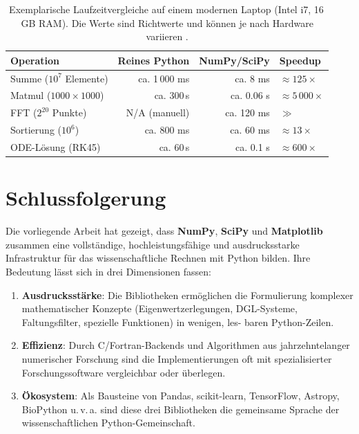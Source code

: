 \documentclass[12pt, a4paper]{article}
\begin{document}
\begin{table}[H]
  \centering
  \begin{tabular}{lrrl}
    \toprule
    \textbf{Operation} & \textbf{Reines Python} & \textbf{NumPy/SciPy} & \textbf{Speedup} \\
    \midrule
    Summe ($10^7$ Elemente) & ca. 1\,000 ms & ca. 8 ms & ${\approx}125\times$ \\
    Matmul ($1000\times1000$) & ca. 300\,s & ca. 0.06 s & ${\approx}5\,000\times$ \\
    FFT ($2^{20}$ Punkte) & N/A (manuell) & ca. 120 ms & $\gg$ \\
    Sortierung ($10^6$) & ca. 800 ms & ca. 60 ms & ${\approx}13\times$ \\
    ODE-Lösung (RK45) & ca. 60\,s & ca. 0.1 s & ${\approx}600\times$ \\
    \bottomrule
  \end{tabular}
  \caption{Exemplarische Laufzeitvergleiche auf einem modernen Laptop
           (Intel i7, 16\,GB RAM). Die Werte sind Richtwerte und können
           je nach Hardware variieren \cite{vanderplas2016python}.}
  \label{tab:perf}
\end{table}

\section{Schlussfolgerung}
\label{sec:conclusion}

Die vorliegende Arbeit hat gezeigt, dass \textbf{NumPy}, \textbf{SciPy}
und \textbf{Matplotlib} zusammen eine vollständige, hochleistungsfähige
und ausdrucksstarke Infrastruktur für das wissenschaftliche Rechnen mit
Python bilden. Ihre Bedeutung lässt sich in drei Dimensionen fassen:

\begin{enumerate}
  \item \textbf{Ausdrucksstärke}: Die Bibliotheken ermöglichen die
  Formulierung komplexer mathematischer Konzepte (Eigenwertzerlegungen,
  DGL-Systeme, Faltungsfilter, spezielle Funktionen) in wenigen, les-
  baren Python-Zeilen.
  
  \item \textbf{Effizienz}: Durch C/Fortran-Backends und Algorithmen
  aus jahrzehntelanger numerischer Forschung sind die Implementierungen
  oft mit spezialisierter Forschungssoftware vergleichbar oder überlegen.
  
  \item \textbf{Ökosystem}: Als Bausteine von Pandas, scikit-learn,
  TensorFlow, Astropy, BioPython u.\,v.\,a. sind diese drei Bibliotheken
  die gemeinsame Sprache der wissenschaftlichen Python-Gemeinschaft.
\end{enumerate}
\end{document}

